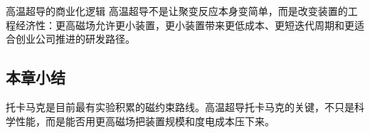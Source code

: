 \begin{importantbox}{高温超导的商业化逻辑}
高温超导不是让聚变反应本身变简单，而是改变装置的工程经济性：更高磁场允许更小装置，更小装置带来更低成本、更短迭代周期和更适合创业公司推进的研发路径。
\end{importantbox}

\subsection{本章小结}

托卡马克是目前最有实验积累的磁约束路线。高温超导托卡马克的关键，不只是科学性能，而是能否用更高磁场把装置规模和度电成本压下来。

